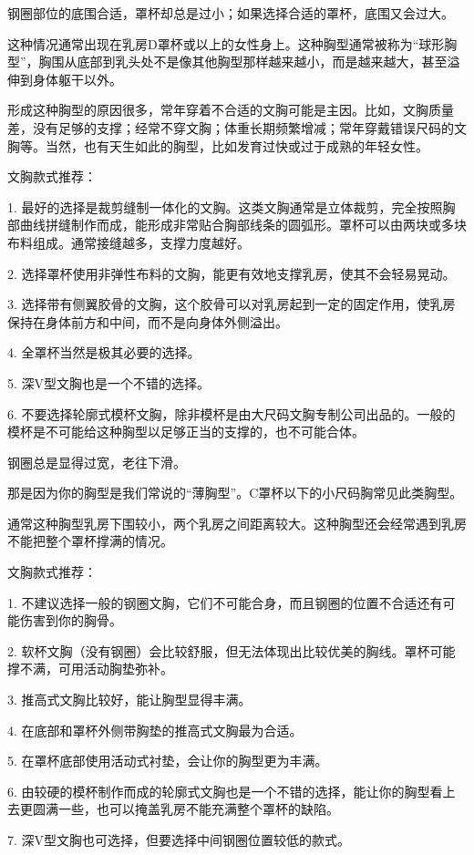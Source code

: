 \documentclass[12pt,UTF8]{ctexbook}
\begin{document}
钢圈部位的底围合适，罩杯却总是过小；如果选择合适的罩杯，底围又会过大。

这种情况通常出现在乳房D罩杯或以上的女性身上。这种胸型通常被称为“球形胸型”，胸围从底部到乳头处不是像其他胸型那样越来越小，而是越来越大，甚至溢伸到身体躯干以外。

形成这种胸型的原因很多，常年穿着不合适的文胸可能是主因。比如，文胸质量差，没有足够的支撑；经常不穿文胸；体重长期频繁增减；常年穿戴错误尺码的文胸等。当然，也有天生如此的胸型，比如发育过快或过于成熟的年轻女性。


文胸款式推荐：

1. 最好的选择是裁剪缝制一体化的文胸。这类文胸通常是立体裁剪，完全按照胸部曲线拼缝制作而成，能形成非常贴合胸部线条的圆弧形。罩杯可以由两块或多块布料组成。通常接缝越多，支撑力度越好。

2. 选择罩杯使用非弹性布料的文胸，能更有效地支撑乳房，使其不会轻易晃动。

3. 选择带有侧翼胶骨的文胸，这个胶骨可以对乳房起到一定的固定作用，使乳房保持在身体前方和中间，而不是向身体外侧溢出。

4. 全罩杯当然是极其必要的选择。

5. 深V型文胸也是一个不错的选择。

6. 不要选择轮廓式模杯文胸，除非模杯是由大尺码文胸专制公司出品的。一般的模杯是不可能给这种胸型以足够正当的支撑的，也不可能合体。


钢圈总是显得过宽，老往下滑。

那是因为你的胸型是我们常说的“薄胸型”。C罩杯以下的小尺码胸常见此类胸型。

通常这种胸型乳房下围较小，两个乳房之间距离较大。这种胸型还会经常遇到乳房不能把整个罩杯撑满的情况。


文胸款式推荐：

1. 不建议选择一般的钢圈文胸，它们不可能合身，而且钢圈的位置不合适还有可能伤害到你的胸骨。

2. 软杯文胸（没有钢圈）会比较舒服，但无法体现出比较优美的胸线。罩杯可能撑不满，可用活动胸垫弥补。

3. 推高式文胸比较好，能让胸型显得丰满。

4. 在底部和罩杯外侧带胸垫的推高式文胸最为合适。

5. 在罩杯底部使用活动式衬垫，会让你的胸型更为丰满。

6. 由较硬的模杯制作而成的轮廓式文胸也是一个不错的选择，能让你的胸型看上去更圆满一些，也可以掩盖乳房不能充满整个罩杯的缺陷。

7. 深V型文胸也可选择，但要选择中间钢圈位置较低的款式。
\end{document}
